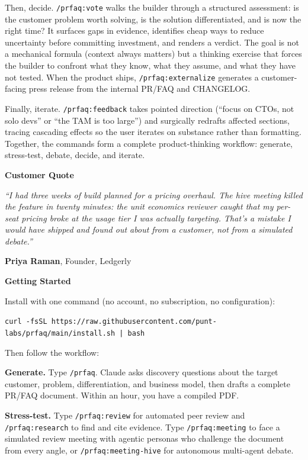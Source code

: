 \documentclass[11pt,letterpaper]{article}
\newcommand{\prsection}[1]{%
  \vspace{1em}%
  {\large\bfseries\color{SectionBlue}#1}%
  \vspace{0.3em}\par%
}
\begin{document}
Then, decide. \texttt{/prfaq:vote} walks the builder through a structured assessment: is the customer problem worth solving, is the solution differentiated, and is now the right time? It surfaces gaps in evidence, identifies cheap ways to reduce uncertainty before committing investment, and renders a verdict. The goal is not a mechanical formula (context always matters) but a thinking exercise that forces the builder to confront what they know, what they assume, and what they have not tested. When the product ships, \texttt{/prfaq:externalize} generates a customer-facing press release from the internal PR/FAQ and CHANGELOG.

Finally, iterate. \texttt{/prfaq:feedback} takes pointed direction (``focus on CTOs, not solo devs'' or ``the TAM is too large'') and surgically redrafts affected sections, tracing cascading effects so the user iterates on substance rather than formatting. Together, the commands form a complete product-thinking workflow: generate, stress-test, debate, decide, and iterate.

\prsection{Customer Quote}

\begin{customerquote}
\textit{``I had three weeks of build planned for a pricing overhaul. The hive meeting killed the feature in twenty minutes: the unit economics reviewer caught that my per-seat pricing broke at the usage tier I was actually targeting. That's a mistake I would have shipped and found out about from a customer, not from a simulated debate.''}

\raggedleft \textbf{Priya Raman}, Founder, Ledgerly
\end{customerquote}

\prsection{Getting Started}

Install with one command (no account, no subscription, no configuration):

\smallskip
{\small\noindent\texttt{curl -fsSL https://raw.githubusercontent.com/punt-labs/prfaq/main/install.sh | bash}}
\smallskip

\noindent Then follow the workflow:

\textbf{Generate.} Type \texttt{/prfaq}. Claude asks discovery questions about the target customer, problem, differentiation, and business model, then drafts a complete PR/FAQ document. Within an hour, you have a compiled PDF.

\textbf{Stress-test.} Type \texttt{/prfaq:review} for automated peer review and \texttt{/prfaq:research} to find and cite evidence. Type \texttt{/prfaq:meeting} to face a simulated review meeting with agentic personas who challenge the document from every angle, or \texttt{/prfaq:meeting-hive} for autonomous multi-agent debate.
\end{document}
